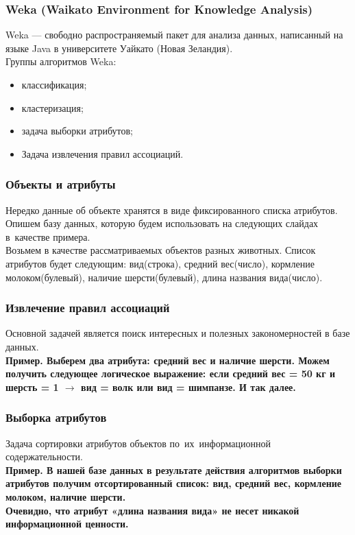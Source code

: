 \documentclass{beamer}
\begin{document}
\begin{frame}
\frametitle{Weka (Waikato Environment for Knowledge Analysis)}
Weka --- свободно распространяемый пакет для анализа данных,
написанный на языке Java в университете Уайкато (Новая Зеландия). \\

\vspace{1cm}
Группы алгоритмов Weka:
\begin{itemize}
\item{классификация;}
\item{кластеризация;}
\item{задача выборки атрибутов;}
\item{Задача извлечения правил ассоциаций.}
\end{itemize}

\end{frame}

\begin{frame}
\frametitle{Объекты и атрибуты}
Нередко данные  об объекте хранятся в виде фиксированного списка атрибутов.\\
\vspace{1cm}
Опишем базу данных, которую будем использовать на следующих слайдах в~качестве примера.\\
\vspace{1cm}
Возьмем в качестве рассматриваемых объектов разных животных.
Список атрибутов будет следующим:
вид(строка), средний вес(число), кормление молоком(булевый), наличие шерсти(булевый), длина названия вида(число).
\end{frame}

\begin{frame}
\frametitle{Извлечение правил ассоциаций}
Основной задачей является поиск интересных и полезных закономерностей в базе данных.\\
\vspace{1cm}
\bf{Пример.}
Выберем два атрибута: средний вес и наличие шерсти.
Можем получить следующее логическое выражение: 
если средний вес = 50 кг и шерсть = 1  $\to$ вид = волк или вид = шимпанзе.
И так далее.

\end{frame}

\begin{frame}
\frametitle{Выборка атрибутов}
Задача сортировки атрибутов объектов по~их~информационной содержательности.\\
\vspace{1cm}
\bf{Пример.}
\vspace{1cm}
В нашей базе данных в результате действия алгоритмов выборки атрибутов получим отсортированный список: вид, средний вес, кормление молоком, наличие шерсти.\\
Очевидно, что атрибут «длина названия вида» не несет никакой информационной ценности.
\end{frame}
\end{document}
